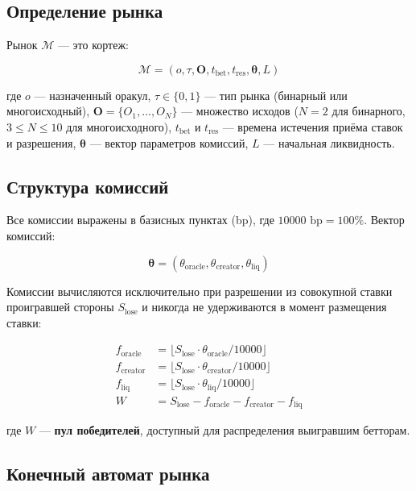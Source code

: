 \documentclass{ledger}
\theoremstyle{plain}
\theoremstyle{remark}
\begin{document}
\subsection{Определение рынка}

Рынок $\mathcal{M}$ --- это кортеж:

\[
\mathcal{M} = (o, \tau, \mathbf{O}, t_{\text{bet}}, t_{\text{res}},
\boldsymbol{\theta}, L)
\]

где $o$ --- назначенный оракул, $\tau \in \{0, 1\}$ --- тип рынка (бинарный или
многоисходный), $\mathbf{O} = \{O_1, \ldots, O_N\}$ --- множество исходов
($N = 2$ для бинарного, $3 \leq N \leq 10$ для многоисходного), $t_{\text{bet}}$ и
$t_{\text{res}}$ --- времена истечения приёма ставок и разрешения,
$\boldsymbol{\theta}$ --- вектор параметров комиссий, $L$ --- начальная ликвидность.

\subsection{Структура комиссий}\label{sec:fees}

Все комиссии выражены в базисных пунктах (bp), где $10000 \text{ bp} = 100\%$.
Вектор комиссий:

\[
\boldsymbol{\theta} = (\theta_{\text{oracle}}, \theta_{\text{creator}},
\theta_{\text{liq}})
\]

Комиссии вычисляются исключительно при разрешении из совокупной ставки проигравшей
стороны $S_{\text{lose}}$ и никогда не удерживаются в момент размещения ставки:

\begin{align*}
f_{\text{oracle}}  &= \lfloor S_{\text{lose}} \cdot \theta_{\text{oracle}} / 10000 \rfloor \\
f_{\text{creator}} &= \lfloor S_{\text{lose}} \cdot \theta_{\text{creator}} / 10000 \rfloor \\
f_{\text{liq}}     &= \lfloor S_{\text{lose}} \cdot \theta_{\text{liq}} / 10000 \rfloor \\
W &= S_{\text{lose}} - f_{\text{oracle}} - f_{\text{creator}} - f_{\text{liq}}
\end{align*}

где $W$ --- \textbf{пул победителей}, доступный для распределения выигравшим
бетторам.

\subsection{Конечный автомат рынка}\label{sec:fsm}
\end{document}
